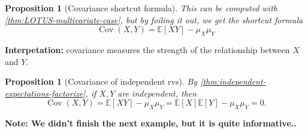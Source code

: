 \documentclass[10pt]{article}
\newtheorem{proposition}[theorem]{Proposition}
\theoremstyle{definition}
\newcommand{\fl}{\noindent\textbf} %
\newcommand{\1}[1]{\textbf{1}_{\left[#1\right]}} %
\def\E{\mathbb{E}} %
\begin{document}
\begin{proposition}[Covariance shortcut formula]
  \label{prop:covariance-shortcut-formula}
  This can be computed with \cref{thm:LOTUS-multivariate-case}, but by foiling
  it out, we get the shortcut formula
  \begin{equation}\label{eq:covariance-shortcut-formula}
    \operatorname{Cov}(X,Y) = \E\left[XY \right] - \mu_{X}\mu_{Y}
  \end{equation}
\end{proposition}

\fl{Interpetation:} covariance measures the strength of the relationship
between $X$ and $Y$.

\begin{proposition}[Covariance of independent rvs]
  By \cref{thm:independent-expectations-factorize}, if $X,Y$ are independent,
  then
  \begin{equation*}
    \operatorname{Cov}(X,Y) = \E\left[XY \right] - \mu_{X}\mu_{Y} = \E\left[X \right] \E\left[Y \right] -\mu_{X}\mu_{Y} = 0.
  \end{equation*}
\end{proposition}


\fl{Note: We didn't finish the next example, but it is quite informative..}
\end{document}
